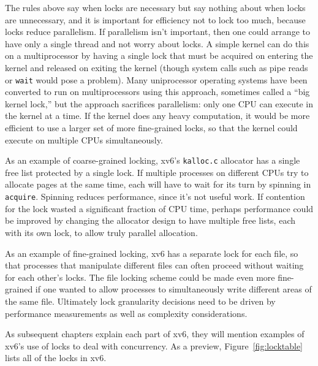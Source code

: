 The rules above say when locks are necessary but say nothing about when locks
are unnecessary, and it is important for efficiency not to lock too much,
because locks reduce parallelism.  If parallelism isn't important, then one
could arrange to have only a single thread and not worry about locks.  A simple
kernel can do this on a multiprocessor by having a single lock that must be
acquired on entering the kernel and released on exiting the kernel (though
system calls such as pipe reads or
\lstinline{wait}
would pose a problem).  Many uniprocessor operating systems have been converted to
run on multiprocessors using this approach, sometimes called a ``big
kernel lock,'' but the approach sacrifices parallelism: only one
CPU can execute in the kernel at a time.  If the kernel does any heavy
computation, it would be more efficient to use a larger set of more
fine-grained locks, so that the kernel could execute on multiple CPUs
simultaneously.

As an example of coarse-grained locking, xv6's \lstinline{kalloc.c}
allocator has a single free list protected by a single lock. If
multiple processes on different CPUs try to allocate pages at the same
time, each will have to wait for its turn by spinning in {\tt
  acquire}. Spinning reduces performance, since it's not useful work.
If contention for the lock wasted a significant fraction of CPU time,
perhaps performance could be improved by changing the allocator design
to have multiple free lists, each with its own lock, to allow truly
parallel allocation.

As an example of fine-grained locking, xv6 has a separate lock for
each file, so that processes that manipulate different files can often
proceed without waiting for each other's locks. The file locking
scheme could be made even more fine-grained if one wanted to allow
processes to simultaneously write different areas of the same file.
Ultimately lock granularity decisions need to be driven by performance
measurements as well as complexity considerations.

As subsequent chapters explain each part of xv6, they
will mention examples of xv6's use of locks
to deal with concurrency.
As a preview,
Figure~\ref{fig:locktable}
lists all of the locks in xv6.


